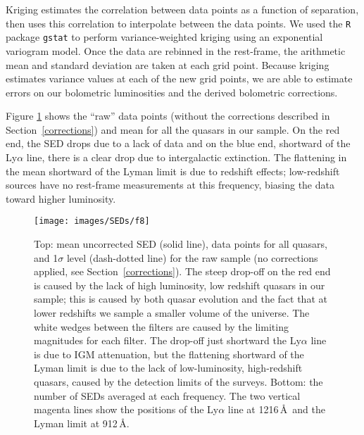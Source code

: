 Kriging 
estimates the correlation between data points as a function of separation, then uses this correlation to interpolate between the data points.  
We used the \texttt{R} package \texttt{gstat} to perform variance-weighted kriging using an exponential variogram model.
Once the data are rebinned in the rest-frame, the arithmetic mean and standard deviation are taken at each grid point.  
Because kriging estimates variance values at each of the new grid points, we are able to estimate errors on our bolometric luminosities and the derived bolometric corrections. 

Figure \ref{mean_no_cor} shows the ``raw'' data points (without the corrections described in Section~\ref{corrections}) and mean for all the quasars in our sample.  On the red end, the SED drops due to a lack of data and on the blue end, shortward of the Ly$\alpha$ line, there is a clear drop due to intergalactic extinction.  The flattening in the mean shortward of the Lyman limit is due to redshift effects; low-redshift sources have no rest-frame measurements at this frequency, biasing the data toward higher luminosity.  

\begin{figure}[t]
 \centering
 \texttt{[image: images/SEDs/f8]}
 \caption[Uncorrected mean SED]{
 Top: mean uncorrected SED (solid line), data points for all quasars, and 1$\sigma$ level (dash-dotted line) for the raw sample (no corrections applied, see Section~\ref{corrections}). The steep drop-off on the red end is caused by the lack of high luminosity, low redshift quasars in our sample; this is caused by both quasar evolution and the fact that at lower redshifts we sample a smaller volume of the universe. The white wedges between the filters are caused by the limiting magnitudes for each filter. The drop-off just shortward the Ly$\alpha$ line is due to IGM attenuation, but the flattening shortward of the Lyman limit is due to the lack of low-luminosity, high-redshift quasars, caused by the detection limits of the surveys.
 Bottom: the number of SEDs averaged at each frequency. The two vertical magenta lines show the positions of the Ly$\alpha$ line at 1216\,\AA\ and the Lyman limit at 912\,\AA.
 }
 \label{mean_no_cor}
\end{figure}

